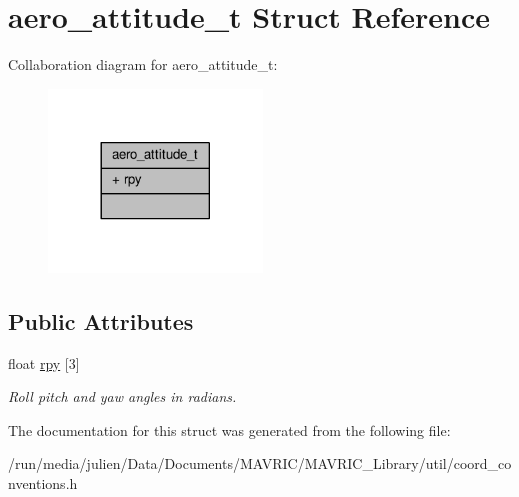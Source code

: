 \hypertarget{structaero__attitude__t}{\section{aero\+\_\+attitude\+\_\+t Struct Reference}
\label{structaero__attitude__t}
}


Collaboration diagram for aero\+\_\+attitude\+\_\+t\+:
\nopagebreak
\begin{figure}[H]
\begin{center}
\leavevmode
\includegraphics[width=161pt]{structaero__attitude__t__coll__graph}
\end{center}
\end{figure}
\subsection*{Public Attributes}
\begin{DoxyCompactItemize}
\item 
\hypertarget{structaero__attitude__t_a4d5779a210f5d31955687d3d91e971c4}{float \hyperlink{structaero__attitude__t_a4d5779a210f5d31955687d3d91e971c4}{rpy} \mbox{[}3\mbox{]}}\label{structaero__attitude__t_a4d5779a210f5d31955687d3d91e971c4}

\begin{DoxyCompactList}\small\item\em Roll pitch and yaw angles in radians. \end{DoxyCompactList}\end{DoxyCompactItemize}


The documentation for this struct was generated from the following file\+:\begin{DoxyCompactItemize}
\item 
/run/media/julien/\+Data/\+Documents/\+M\+A\+V\+R\+I\+C/\+M\+A\+V\+R\+I\+C\+\_\+\+Library/util/coord\+\_\+conventions.\+h\end{DoxyCompactItemize}
